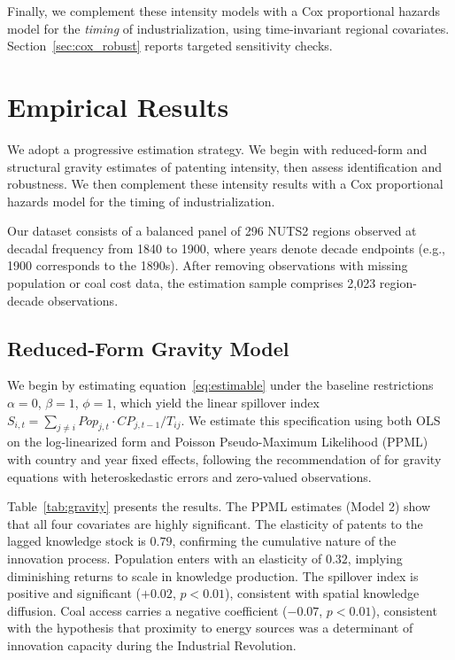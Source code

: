 \documentclass[letterpaper,12pt,leqno]{article}
\begin{document}
Finally, we complement these intensity models with a Cox proportional hazards model for the {\em timing} of industrialization, using time-invariant regional covariates. Section~\ref{sec:cox_robust} reports targeted sensitivity checks.


\section{Empirical Results}

We adopt a progressive estimation strategy. We begin with reduced-form and structural gravity estimates of patenting intensity, then assess identification and robustness. We then complement these intensity results with a Cox proportional hazards model for the timing of industrialization.

Our dataset consists of a balanced panel of 296 NUTS2 regions observed at decadal frequency from 1840 to 1900, where years denote decade endpoints (e.g., 1900 corresponds to the 1890s). After removing observations with missing population or coal cost data, the estimation sample comprises 2,023 region-decade observations.

\subsection{Reduced-Form Gravity Model}

We begin by estimating equation~\eqref{eq:estimable} under the baseline restrictions \(\alpha = 0\), \(\beta = 1\), \(\phi = 1\), which yield the linear spillover index \(S_{i,t} = \sum_{j \neq i} Pop_{j,t} \cdot CP_{j,t-1} / T_{ij}\). We estimate this specification using both OLS on the log-linearized form and Poisson Pseudo-Maximum Likelihood (PPML) with country and year fixed effects, following the recommendation of \citet{santos2006log} for gravity equations with heteroskedastic errors and zero-valued observations.



Table~\ref{tab:gravity} presents the results. The PPML estimates (Model 2) show that all four covariates are highly significant. The elasticity of patents to the lagged knowledge stock is \(0.79\), confirming the cumulative nature of the innovation process. Population enters with an elasticity of \(0.32\), implying diminishing returns to scale in knowledge production. The spillover index is positive and significant (\(+0.02\), \(p < 0.01\)), consistent with spatial knowledge diffusion. Coal access carries a negative coefficient (\(-0.07\), \(p < 0.01\)), consistent with the hypothesis that proximity to energy sources was a determinant of innovation capacity during the Industrial Revolution.
\end{document}
